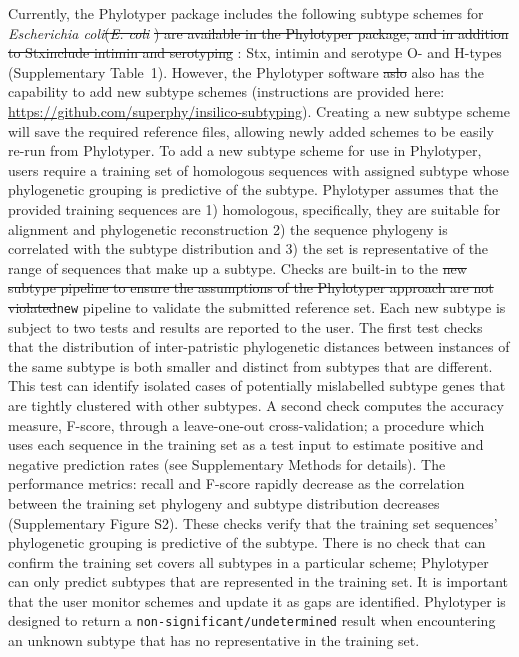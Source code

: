 \documentclass{bioinfo}
\providecommand{\DIFadd}[1]{{\protect\color{red}#1}} %
\providecommand{\DIFdel}[1]{{\protect\color{red}\sout{#1}}}                      %
\providecommand{\DIFaddbegin}{} %
\providecommand{\DIFaddend}{} %
\providecommand{\DIFdelbegin}{} %
\providecommand{\DIFdelend}{} %
\begin{document}
Currently, \DIFaddbegin \DIFadd{the Phylotyper package includes the following }\DIFaddend subtype schemes for \emph{Escherichia coli}\DIFdelbegin \DIFdel{(}\textit{\DIFdel{E. coli}}%
\DIFdel{) are available in the Phylotyper package, and in addition to Stxinclude intimin and serotyping  }\DIFdelend \DIFaddbegin \DIFadd{: Stx, intimin and serotype O- and H-types  }\DIFaddend (Supplementary Table~1).
However, the Phylotyper software \DIFdelbegin \DIFdel{aslo }\DIFdelend \DIFaddbegin \DIFadd{also }\DIFaddend has the capability to add new subtype schemes \DIFaddbegin \DIFadd{(instructions are provided here: }\url{https://github.com/superphy/insilico-subtyping}\DIFadd{)}\DIFaddend . 
Creating a new subtype scheme will save the required reference files, allowing newly added schemes to be easily re-run from Phylotyper.
\DIFaddbegin \DIFadd{To add a new subtype scheme for use in Phylotyper, users require a training set of homologous sequences with assigned subtype whose phylogenetic grouping is predictive of the subtype.
Phylotyper assumes that the provided training sequences are 1) homologous, specifically, they are suitable for alignment and phylogenetic reconstruction 2) the sequence phylogeny is correlated with the subtype distribution and 3) the set is representative of the range of sequences that make up a subtype.
}\DIFaddend Checks are built-in to the \DIFdelbegin \DIFdel{new subtype pipeline to ensure the assumptions of the Phylotyper approach are not violated}\DIFdelend \DIFaddbegin \texttt{\DIFadd{new}} \DIFadd{pipeline to validate the submitted reference set.
Each new subtype is subject to two tests and results are reported to the user.
The first test checks that the distribution of inter-patristic phylogenetic distances between instances of the same subtype is both smaller and distinct from subtypes that are different.
This test can identify isolated cases of potentially mislabelled subtype genes that are tightly clustered with other subtypes.
A second check computes the accuracy measure, F-score, through a leave-one-out cross-validation; a procedure which uses each sequence in the training set as a test input to estimate positive and negative prediction rates (see Supplementary Methods for details).
The performance metrics: recall and F-score rapidly decrease as the correlation between the training set phylogeny and subtype distribution decreases (Supplementary Figure S2).
These checks verify that the training set sequences' phylogenetic grouping is predictive of the subtype.
There is no check that can confirm the training set covers all subtypes in a particular scheme; Phylotyper can only predict subtypes that are represented in the training set.
It is important that the user monitor schemes and update it as gaps are identified.
Phylotyper is designed to return a }\texttt{\DIFadd{non-significant/undetermined}} \DIFadd{result when encountering an unknown subtype that has no representative in the training set}\DIFaddend .
\end{document}
